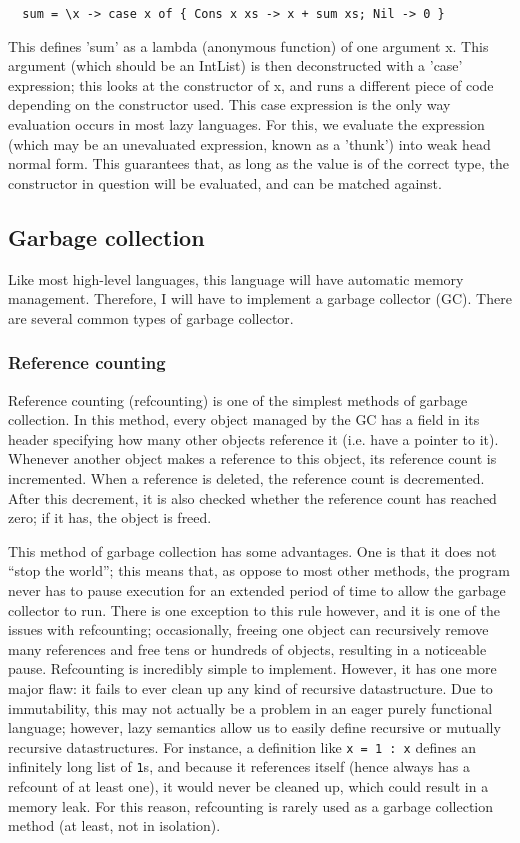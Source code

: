 \documentclass[9pt]{extarticle}
\begin{document}
\begin{verbatim}
  sum = \x -> case x of { Cons x xs -> x + sum xs; Nil -> 0 } 
\end{verbatim}

This defines 'sum' as a lambda (anonymous function) of one argument x. This
argument (which should be an IntList) is then deconstructed with a 'case'
expression; this looks at the constructor of x, and runs a different piece of
code depending on the constructor used. This case expression is the only way
evaluation occurs in most lazy languages. For this, we evaluate the expression
(which may be an unevaluated expression, known as a 'thunk') into weak head
normal form. This guarantees that, as long as the value is of the correct type,
the constructor in question will be evaluated, and can be matched against. 

\subsection{Garbage collection}

Like most high-level languages, this language will have automatic memory
management. Therefore, I will have to implement a garbage collector
(GC). There are several common types of garbage collector.

\subsubsection{Reference counting}

Reference counting (refcounting) is one of the simplest methods of
garbage collection. In this method, every object managed by the GC has a
field in its header specifying how many other objects reference it (i.e.
have a pointer to it). Whenever another object makes a reference to this
object, its reference count is incremented. When a reference is deleted,
the reference count is decremented. After this decrement, it is also
checked whether the reference count has reached zero; if it has, the
object is freed.

This method of garbage collection has some advantages. One is that it
does not ``stop the world''; this means that, as oppose to most other
methods, the program never has to pause execution for an extended period
of time to allow the garbage collector to run. There is one exception to
this rule however, and it is one of the issues with refcounting;
occasionally, freeing one object can recursively remove many references
and free tens or hundreds of objects, resulting in a noticeable pause.
Refcounting is incredibly simple to implement. However, it has one more
major flaw: it fails to ever clean up any kind of recursive
datastructure. Due to immutability, this may not actually be a problem
in an eager purely functional language; however, lazy semantics allow us
to easily define recursive or mutually recursive datastructures. For
instance, a definition like \verb'x = 1 : x' defines an infinitely long
list of \verb'1's, and because it references itself (hence always has a
refcount of at least one), it would never be cleaned up, which could
result in a memory leak. For this reason, refcounting is rarely used as
a garbage collection method (at least, not in isolation).
\end{document}

